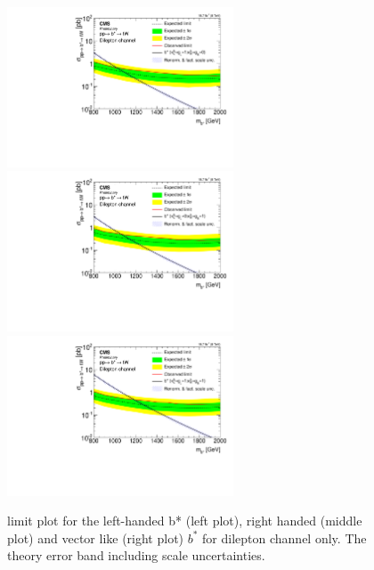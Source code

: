 \begin{figure}[htcb]
\centering 
\includegraphics[width=0.6\textwidth]{AN-14-049/figs/bayesian_dileptonic_left_limit_band_plot}\\
\includegraphics[width=0.6\textwidth]{AN-14-049/figs/bayesian_dileptonic_right_limit_band_plot}\\
\includegraphics[width=0.6\textwidth]{AN-14-049/figs/bayesian_dileptonic_vector_limit_band_plot}
\caption{limit plot for the left-handed b* (left plot), right handed (middle plot) and vector like (right plot) $b^*$ for dilepton channel only. The theory error band including scale uncertainties.}
\label{figs:bslimitsdilep}
\end{figure}

